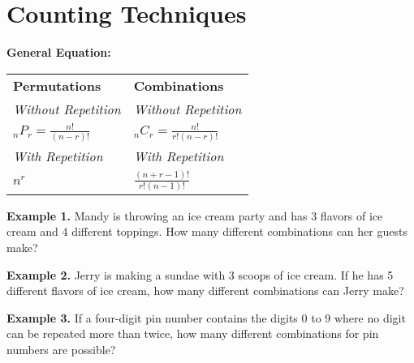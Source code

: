\documentclass[12pt]{article}
\begin{document}
\section{Counting Techniques}

\bigskip
\textbf{General Equation:} 

\begin{tabularx}{\textwidth}{*2{@{}>{\centering\arraybackslash}X}}
\textbf{Permutations} & \textbf{Combinations}\\
\textit{Without Repetition} & \textit{Without Repetition}\\
$_nP_r=\frac{n!}{(n-r)!}$ & $_nC_r=\frac{n!}{r!(n-r)!}$\\[2em]
\textit{With Repetition} & \textit{With Repetition}\\
$n^r$ & $\frac{(n+r-1)!}{r!(n-1)!}$
\end{tabularx}

\vfill
\textbf{Example 1.} Mandy is throwing an ice cream party and has 3 flavors of ice cream and 4 different toppings. How many different combinations can her guests make?

\vfill
\textbf{Example 2.} Jerry is making a sundae with 3 scoops of ice cream. If he has 5 different flavors of ice cream, how many different combinations can Jerry make?

\vfill
\textbf{Example 3.} If a four-digit pin number contains the digits 0 to 9 where no digit can be repeated more than twice, how many different combinations for pin numbers are possible?
\end{document}
